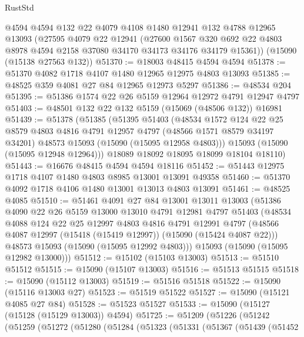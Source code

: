 \begin{lexlean}{RustStd}
\begin{coremodule}
    @4594
    @4594
    @132
    @22
    @4079
    @4108
    @1480
    @12941
    @132
    @4788
    @12965
    @13093
    (@27595
      @4079
      @22
      @12941
      (@27600
        @1567
        @320
        @692
        @22
        @4803
        @8978
        @4594
        @2158
        @37080
        @34170
        @34173
        @34176
        @34179
        @15361))
    (@15090 (@15138 @27563 @132))
@51370 := @18003 @48415 @4594 @4594
@51378 := @51370 @4082 @1718 @4107 @1480 @12965 @12975 @4803 @13093
@51385 := @48525 @359 @4081 @27 @84 @12965 @12973 @5297
@51386 := @48534 @204
@51395 := @51386 @1574 @22 @26 @5159 @12964 @12972 @4791 @12947 @4797
@51403 := @48501 @132 @22 @132 @5159 (@15069 (@48506 @132)) @16981
@51439 := @51378
    (@51385
      (@51395
        @51403
        (@48534
          @1572
          @124
          @22
          @25
          @8579
          @4803
          @4816
          @4791
          @12957
          @4797
          (@48566 @1571 @8579 @34197 @34201)
          @48573
          @15093
          (@15090 (@15095 @12958 @4803)))
        @15093
        (@15090 (@15095 @12948 @12964)))
      @18089
      @18092
      @18095
      @18099
      @18104
      @18110)
@51443 := @16676 @48415 @4594 @4594 @18116
@51452 := @51443 @12975 @1718 @4107 @1480 @4803 @8985 @13001 @13091 @49358
@51460 := @51370 @4092 @1718 @4106 @1480 @13001 @13013 @4803 @13091
@51461 := @48525 @4085
@51510 := @51461
    @4091
    @27
    @84
    @13001
    @13011
    @13003
    (@51386
      @4090
      @22
      @26
      @5159
      @13000
      @13010
      @4791
      @12981
      @4797
      @51403
      (@48534
        @4088
        @124
        @22
        @25
        @12997
        @4803
        @4816
        @4791
        @12991
        @4797
        (@48566 @4087 @12997 (@15418 (@15419 @12997)) (@15090 (@15424 @4087 @22)))
        @48573
        @15093
        (@15090 (@15095 @12992 @4803)))
      @15093
      (@15090 (@15095 @12982 @13000)))
@51512 := @15102 (@15103 @13003)
@51513 := @51510 @51512
@51515 := @15090 (@15107 @13003)
@51516 := @51513 @51515
@51518 := @15090 (@15112 @13003)
@51519 := @51516 @51518
@51522 := @15090 (@15116 @13003 @27)
@51523 := @51519 @51522
@51527 := @15090 (@15121 @4085 @27 @84)
@51528 := @51523 @51527
@51533 := @15090 (@15127 (@15128 (@15129 @13003)) @4594)
@51725 := @51209
    (@51226
      (@51242
        (@51259
          (@51272
            (@51280
              (@51284
                (@51323
                  (@51331
                    (@51367
                      (@51439
                        (@51452

\end{coremodule}
\end{lexlean}
